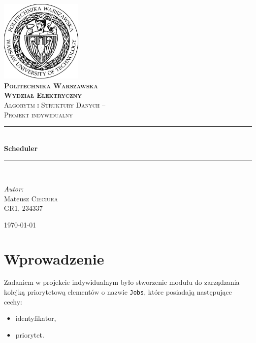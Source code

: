\documentclass[12pt,a4paper]{article}
\newcommand{\HRule}{\rule{\linewidth}{0.5mm}}
\begin{document}
\begin{titlepage}

	\begin{center}
    \includegraphics[width=0.3\textwidth]{img/logo.jpg}\\[1cm]
    
    \textsc{\LARGE \textbf{Politechnika Warszawska \\ Wydział Elektryczny}}\\[1.5cm]
    
    \large \textsc{Algorytm i Struktury Danych -- \\ Projekt indywidualny}\\[0.5cm]

    \HRule \\[0.4cm]
    {\huge \bfseries Scheduler }\\[0.2cm]
    \HRule \\[1.5cm]
   
		\begin{flushleft}
		\textit{Autor:} \\
    {\large
    Mateusz \textsc{Cieciura} \\ GR1, 234337}
		\end{flushleft}
    
    \vfill

    {\large \today}
  \end{center}

\end{titlepage}

\tableofcontents

\section{Wprowadzenie}

Zadaniem w projekcie indywidualnym było stworzenie modułu do zarządzania kolejką priorytetową elementów o nazwie \texttt{Jobs}, które posiadają następujące cechy:

\begin{itemize}
	\item identyfikator,
	\item priorytet.
\end{itemize}
\end{document}
